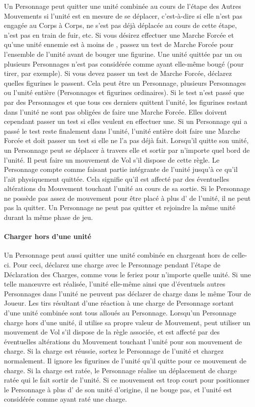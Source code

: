 Un Personnage peut quitter une unité combinée au cours de l'étape des Autres Mouvements si l'unité est en mesure de se déplacer, c'est-à-dire si elle n'est pas engagée au Corps à Corps, ne s'est pas déjà déplacée au cours de cette étape, n'est pas en train de fuir, etc. Si vous désirez effectuer une Marche Forcée et qu'une unité ennemie est à moins de , passez un test de Marche Forcée pour l'ensemble de l'unité avant de bouger une figurine. Une unité quittée par un ou plusieurs Personnages n'est pas considérée comme ayant elle-même bougé (pour tirer, par exemple). Si vous devez passer un test de Marche Forcée, déclarez quelles figurines le passent. Cela peut être un Personnage, plusieurs Personnages ou l'unité entière (Personnages et figurines ordinaires). Si le test n'est passé que par des Personnages et que tous ces derniers quittent l'unité, les figurines restant dans l'unité ne sont pas obligées de faire une Marche Forcée. Elles doivent cependant passer un test si elles veulent en effectuer une. Si un Personnage qui a passé le test reste finalement dans l'unité, l'unité entière doit faire une Marche Forcée et doit passer un test si elle ne l'a pas déjà fait. Lorsqu'il quitte son unité, un Personnage peut se déplacer à travers elle et sortir par n'importe quel bord de l'unité. Il peut faire un mouvement de Vol s'il dispose de cette règle. Le Personnage compte comme faisant partie intégrante de l'unité jusqu'à ce qu'il l'ait physiquement quittée. Cela signifie qu'il est affecté par des éventuelles altérations du Mouvement touchant l'unité au cours de sa sortie. Si le Personnage ne possède pas assez de mouvement pour être placé à plus d' de l'unité, il ne peut pas la quitter. Un Personnage ne peut pas quitter et rejoindre la même unité durant la même phase de jeu.

\paragraph{Charger hors d'une unité}

Un Personnage peut aussi quitter une unité combinée en chargeant hors de celle-ci. Pour ceci, déclarez une charge avec le Personnage pendant l'étape de Déclaration des Charges, comme vous le feriez pour n'importe quelle unité. Si une telle manœuvre est réalisée, l'unité elle-même ainsi que d'éventuels autres Personnages dans l'unité ne peuvent pas déclarer de charge dans le même Tour de Joueur. Les tirs résultant d'une réaction à une charge de Personnage sortant d'une unité combinée sont tous alloués au Personnage. Lorsqu'un Personnage charge hors d'une unité, il utilise sa propre valeur de Mouvement, peut utiliser un mouvement de Vol s'il dispose de la règle associée, et est affecté par des éventuelles altérations du Mouvement touchant l'unité pour son mouvement de charge. Si la charge est réussie, sortez le Personnage de l'unité et chargez normalement. Il ignore les figurines de l'unité qu'il quitte pour ce mouvement de charge. Si la charge est ratée, le Personnage réalise un déplacement de charge ratée qui le fait sortir de l'unité. Si ce mouvement est trop court pour positionner le Personnage à plus d' de son unité d'origine, il ne bouge pas, et l'unité est considérée comme ayant raté une charge.

